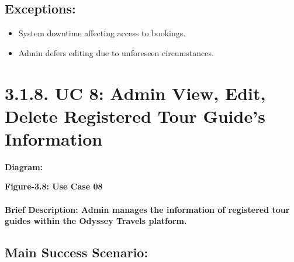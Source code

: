 \documentclass{scrreprt}
\begin{document}
\subsection*{\textbf{Exceptions:}}

\begin{itemize}
    \item System downtime affecting access to bookings.
    \item Admin defers editing due to unforeseen circumstances.
\end{itemize}

\section*{\textbf{3.1.8. UC 8: Admin View, Edit, Delete Registered Tour Guide's Information}}
\textbf{Diagram:}
\newline

\begin{center}
    \parbox{0.8\textwidth}{ 
        \centering
    }
\end{center}
\begin{center}
    \parbox{0.8\textwidth}{ 
        \centering
        \textbf{Figure-3.8: Use Case 08}
    }
\end{center}

\paragraph {\textnormal{Brief Description: 
Admin manages the information of registered tour guides within the Odyssey Travels platform.}}

\subsection*{\textbf{Main Success Scenario:}}
\end{document}
